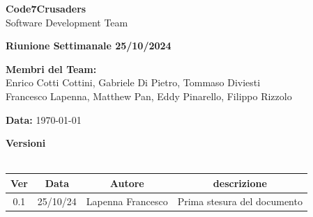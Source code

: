 \documentclass{article}
\begin{document}
\begin{titlepage}
    {\Huge \textbf{Code7Crusaders}}\\
    \vspace{0.5cm}
    {\Large Software Development Team}\\
    \vspace{2cm}
    
    {\large \textbf{Riunione Settimanale 25/10/2024}}\\
    \vspace{5cm}

    \textbf{Membri del Team:}\\
    Enrico Cotti Cottini, Gabriele Di Pietro, Tommaso Diviesti \\
    Francesco Lapenna, Matthew Pan, Eddy Pinarello, Filippo Rizzolo \\
    \vspace{0.5cm}
    
    {\large \textbf{Data:}} \today\\
    
    \vspace{1cm}
\end{titlepage}

\newpage
\tableofcontents

\newpage
\begin{center}
    \textbf{Versioni}
    \\
    \\
    \begin{tabular}{|c|c|c|c|}
        \hline
        \textbf{Ver} & \textbf{Data} & \textbf{Autore} & \textbf{descrizione}\\
        \hline
        0.1 & 25/10/24 & Lapenna Francesco & Prima stesura del documento \\ 
        \hline
    \end{tabular}
\end{center}

\newpage
\end{document}
